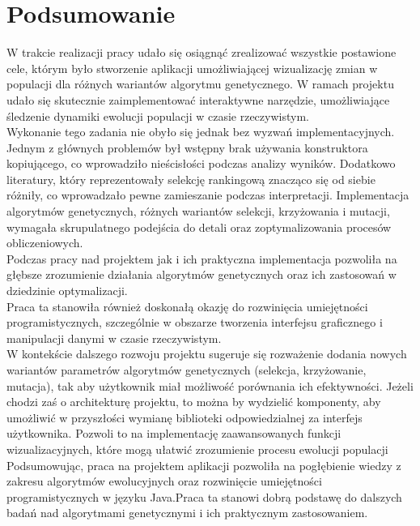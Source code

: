 \chapter{Podsumowanie}
\label{chap:podsumowanie}
W trakcie realizacji pracy udało się osiągnąć zrealizować wszystkie postawione cele, którym było stworzenie aplikacji umożliwiającej wizualizację zmian w populacji dla różnych wariantów algorytmu genetycznego. W ramach projektu udało się skutecznie zaimplementować interaktywne narzędzie, umożliwiające śledzenie dynamiki ewolucji populacji w czasie rzeczywistym.
\\
Wykonanie tego zadania nie obyło się jednak bez wyzwań implementacyjnych. Jednym z głównych problemów był wstępny brak używania konstruktora kopiującego, co wprowadziło nieścisłości podczas analizy wyników. Dodatkowo literatury, który reprezentowały selekcję rankingową znacząco się od siebie różniły, co wprowadzało pewne zamieszanie podczas interpretacji. Implementacja algorytmów genetycznych, różnych wariantów selekcji, krzyżowania i mutacji, wymagała skrupulatnego podejścia do detali oraz zoptymalizowania procesów obliczeniowych.
\\
Podczas pracy nad projektem jak i ich praktyczna implementacja pozwoliła na głębsze zrozumienie działania algorytmów genetycznych  oraz ich zastosowań w dziedzinie optymalizacji.
\\
Praca ta stanowiła również doskonałą okazję do rozwinięcia umiejętności programistycznych, szczególnie w obszarze tworzenia interfejsu graficznego i manipulacji danymi w czasie rzeczywistym.
\\
W kontekście dalszego rozwoju projektu sugeruje się rozważenie dodania nowych wariantów parametrów algorytmów genetycznych (selekcja, krzyżowanie, mutacja), tak aby użytkownik miał możliwość porównania ich efektywności.
Jeżeli chodzi zaś o architekturę projektu, to można by wydzielić komponenty, aby umożliwić w przyszłości wymianę biblioteki odpowiedzialnej za interfejs użytkownika. Pozwoli to na implementację zaawansowanych funkcji wizualizacyjnych, które mogą ułatwić zrozumienie procesu ewolucji populacji
\\
Podsumowując, praca na projektem aplikacji pozwoliła na pogłębienie wiedzy z zakresu algorytmów ewolucyjnych oraz rozwinięcie umiejętności programistycznych w języku Java.\linebreak Praca ta stanowi dobrą podstawę do dalszych badań nad algorytmami genetycznymi i ich praktycznym zastosowaniem.


